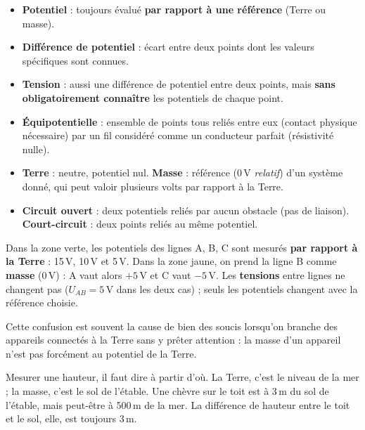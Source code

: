 
\begin{defnbox}[title=Mots clefs]
\begin{itemize}
  \item \textbf{Potentiel} : toujours évalué \textbf{par rapport à une référence} (Terre ou
        masse).
  \item \textbf{Différence de potentiel} : écart entre deux points dont les valeurs
        spécifiques sont connues.
  \item \textbf{Tension} : aussi une différence de potentiel entre deux points, mais
        \textbf{sans obligatoirement connaître} les potentiels de chaque point.
  \item \textbf{Équipotentielle} : ensemble de points tous reliés entre eux (contact physique
        nécessaire) par un fil considéré comme un conducteur parfait (résistivité nulle).
  \item \textbf{Terre} : neutre, potentiel nul. \textbf{Masse} : référence (0\,V
        \emph{relatif}) d'un système donné, qui peut valoir plusieurs volts par rapport à la
        Terre.
  \item \textbf{Circuit ouvert} : deux potentiels reliés par aucun obstacle (pas de liaison).
        \textbf{Court-circuit} : deux points reliés au même potentiel.
\end{itemize}
\end{defnbox}

\begin{exbox}[title={Lire la diapositive : même tension, potentiels différents}]
Dans la zone verte, les potentiels des lignes A, B, C sont mesurés \textbf{par rapport à la
Terre} : 15\,V, 10\,V et 5\,V. Dans la zone jaune, on prend la ligne B comme
\textbf{masse} (0\,V) : A vaut alors $+5$\,V et C vaut $-5$\,V. Les \textbf{tensions} entre
lignes ne changent pas ($U_{AB} = 5$\,V dans les deux cas) ; seuls les potentiels changent
avec la référence choisie.
\end{exbox}

\begin{warnbox}[title=Ne pas confondre Terre et masse]
Cette confusion est souvent la cause de bien des soucis lorsqu'on branche des appareils
connectés à la Terre sans y prêter attention : la masse d'un appareil n'est pas forcément
au potentiel de la Terre.
\end{warnbox}

\begin{goatbox}
Mesurer une hauteur, il faut dire \og à partir d'où\fg{}. La Terre, c'est le niveau de la
mer ; la masse, c'est le sol de l'étable. Une chèvre sur le toit est à 3\,m du sol de
l'étable, mais peut-être à 500\,m de la mer. La différence de hauteur entre le toit et le
sol, elle, est toujours 3\,m.
\end{goatbox}

